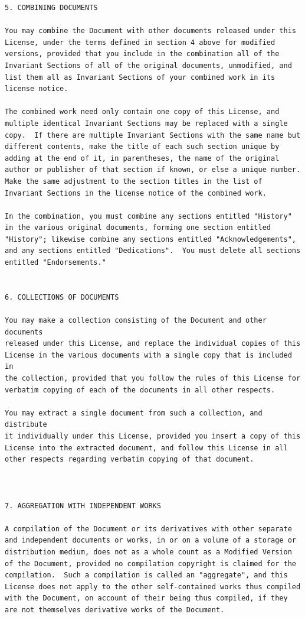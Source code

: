 \documentclass[12pt]{report}
\begin{document}
\begin{verbatim}
5. COMBINING DOCUMENTS

You may combine the Document with other documents released under this
License, under the terms defined in section 4 above for modified
versions, provided that you include in the combination all of the
Invariant Sections of all of the original documents, unmodified, and
list them all as Invariant Sections of your combined work in its
license notice.

The combined work need only contain one copy of this License, and
multiple identical Invariant Sections may be replaced with a single
copy.  If there are multiple Invariant Sections with the same name but
different contents, make the title of each such section unique by
adding at the end of it, in parentheses, the name of the original
author or publisher of that section if known, or else a unique number.
Make the same adjustment to the section titles in the list of
Invariant Sections in the license notice of the combined work.

In the combination, you must combine any sections entitled "History"
in the various original documents, forming one section entitled
"History"; likewise combine any sections entitled "Acknowledgements",
and any sections entitled "Dedications".  You must delete all sections
entitled "Endorsements."


6. COLLECTIONS OF DOCUMENTS

You may make a collection consisting of the Document and other documents
released under this License, and replace the individual copies of this
License in the various documents with a single copy that is included in
the collection, provided that you follow the rules of this License for
verbatim copying of each of the documents in all other respects.

You may extract a single document from such a collection, and distribute
it individually under this License, provided you insert a copy of this
License into the extracted document, and follow this License in all
other respects regarding verbatim copying of that document.



7. AGGREGATION WITH INDEPENDENT WORKS

A compilation of the Document or its derivatives with other separate
and independent documents or works, in or on a volume of a storage or
distribution medium, does not as a whole count as a Modified Version
of the Document, provided no compilation copyright is claimed for the
compilation.  Such a compilation is called an "aggregate", and this
License does not apply to the other self-contained works thus compiled
with the Document, on account of their being thus compiled, if they
are not themselves derivative works of the Document.


\end{verbatim}
\end{document}
